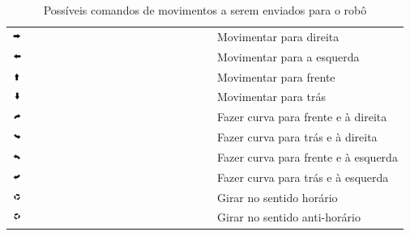 \begin{table}[H]
  \caption{Possíveis comandos de movimentos a serem enviados para o robô}
  \centering
  \begin{tabular}{p{2cm}p{8cm}}
    \toprule
    \includegraphics[width=0.05\textwidth]{./images/seta_direita.png} & Movimentar para direita \\
    \includegraphics[width=0.05\textwidth]{./images/seta_esquerda.png} & Movimentar para a esquerda \\
    \includegraphics[width=0.05\textwidth]{./images/seta_cima.png} & Movimentar para frente \\
    \includegraphics[width=0.05\textwidth]{./images/seta_baixo.png} & Movimentar para trás \\
    \includegraphics[width=0.05\textwidth]{./images/curva_direita_cima.png} & Fazer curva para frente e à direita  \\
    \includegraphics[width=0.05\textwidth]{./images/curva_direita_abaixo.png} & Fazer curva para trás e à direita \\
    \includegraphics[width=0.05\textwidth]{./images/curva_esquerda_cima.png} & Fazer curva para frente e à esquerda \\
    \includegraphics[width=0.05\textwidth]{./images/curva_esquerda_abaixo.png} & Fazer curva para trás e à esquerda  \\
    \includegraphics[width=0.05\textwidth]{./images/giro_horario.png} & Girar no sentido horário \\
    \includegraphics[width=0.05\textwidth]{./images/giro_anti_horario.png} & Girar no sentido anti-horário \\
    \hline
  \end{tabular}
  \label{tab:alternativas_desenho}
\end{table}

